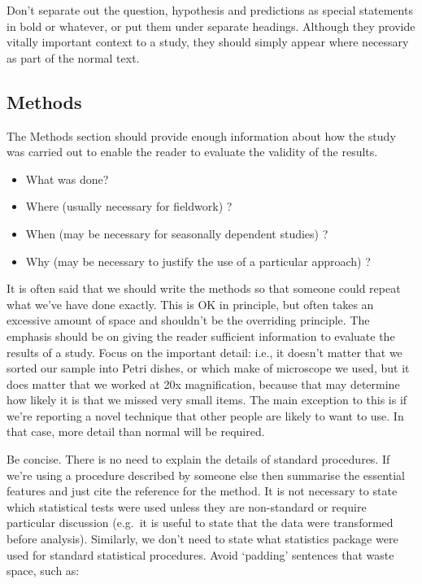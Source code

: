 \documentclass[
]{book}
\providecommand{\tightlist}{%
  \setlength{\itemsep}{0pt}\setlength{\parskip}{0pt}}
\begin{document}
Don't separate out the question, hypothesis and predictions as special statements in bold or whatever, or put them under separate headings. Although they provide vitally important context to a study, they should simply appear where necessary as part of the normal text.

\hypertarget{methods}{%
\subsection{Methods}\label{methods}}

The Methods section should provide enough information about how the study was carried out to enable the reader to evaluate the validity of the results.

\begin{itemize}
\tightlist
\item
  What was done?
\item
  Where (usually necessary for fieldwork) ?
\item
  When (may be necessary for seasonally dependent studies) ?
\item
  Why (may be necessary to justify the use of a particular approach) ?
\end{itemize}

It is often said that we should write the methods so that someone could repeat what we've have done exactly. This is OK in principle, but often takes an excessive amount of space and shouldn't be the overriding principle. The emphasis should be on giving the reader sufficient information to evaluate the results of a study. Focus on the important detail: i.e., it doesn't matter that we sorted our sample into Petri dishes, or which make of microscope we used, but it does matter that we worked at 20x magnification, because that may determine how likely it is that we missed very small items. The main exception to this is if we're reporting a novel technique that other people are likely to want to use. In that case, more detail than normal will be required.

Be concise. There is no need to explain the details of standard procedures. If we're using a procedure described by someone else then summarise the essential features and just cite the reference for the method. It is not necessary to state which statistical tests were used unless they are non-standard or require particular discussion (e.g.~it is useful to state that the data were transformed before analysis). Similarly, we don't need to state what statistics package were used for standard statistical procedures. Avoid `padding' sentences that waste space, such as:
\end{document}
